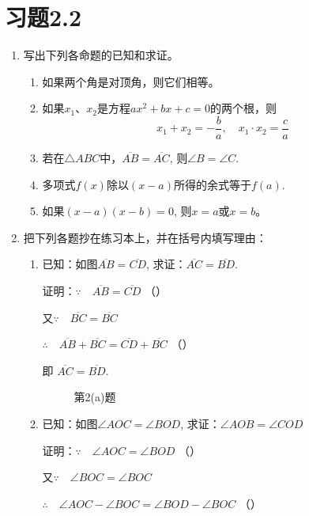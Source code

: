 \section*{习题2.2}
\begin{enumerate}
	\item 写出下列各命题的已知和求证。
\begin{enumerate}
\item 如果两个角是对顶角，则它们相等。
\item 如果$x_1$、$x_2$是方程$ax^2+bx+c=0$的两个根，则
	$$x_1+x_2=-\frac{b}{a},\quad x_1\cdot x_2=\frac{c}{a}$$
	\item 若在$\triangle ABC$中，$\overline{AB}=\overline{AC}$, 则$\angle B=\angle C$.
	\item 多项式$f(x)$除以$(x-a)$所得的余式等于$f(a)$.
	\item 如果$(x-a)(x-b)=0$, 则$x=a$或$x=b$。
\end{enumerate}

\item 把下列各题抄在练习本上，并在括号内填写理由：
\begin{enumerate}
	\item 已知：如图$\overline{AB}=\overline{CD}$, 	求证：$\overline{AC}=\overline{BD}$.

	证明：$\because\quad \overline{AB}=\overline{CD}$ （\qquad）

	又$\because\quad \overline{BC}=\overline{BC}$

	$\therefore\quad \overline{AB}+\overline{BC}=\overline{CD}+\overline{BC}$ （\qquad）

	即 $\overline{AC}=\overline{BD}$.

\begin{figure}[htp]
	\centering
{}
	\caption{第2(a)题}
\end{figure}

\item 已知：如图$\angle AOC=\angle BOD$, 求证：$\angle AOB=\angle COD$

证明：$\because\quad \angle AOC=\angle BOD$ （\qquad）
	
又$\because\quad \angle BOC=\angle BOC$

$\therefore\quad \angle AOC-\angle BOC=\angle BOD-\angle BOC$ （\qquad ）


\end{enumerate}
\end{enumerate}
